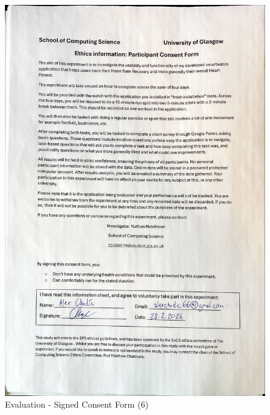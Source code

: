 \documentclass{l4proj}
\begin{document}
\begin{figure}[h!]
    \centering
    \includegraphics[width=1\linewidth]{dissertation//dissImages/Consent6.jpg}
    \caption{Evaluation - Signed Consent Form (6)}
\end{figure}
\end{document}
